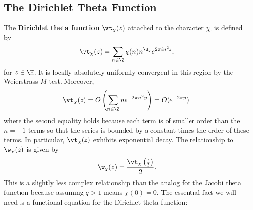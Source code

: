     \subsection*{The Dirichlet Theta Function}
      The \textbf{Dirichlet theta function} \(\vt_{\chi}(z)\) attached to the character \(\chi\), is defined by
      \[
        \vt_{\chi}(z) = \sum_{n \in \Z}\chi(n)n^{\d_{\chi}}e^{2\pi in^{2}z},
      \]
      for \(z \in \H\). It is locally absolutely uniformly convergent in this region by the Weierstrass \(M\)-test. Moreover,
      \[
        \vt_{\chi}(z) = O\left(\sum_{n \in \Z}ne^{-2\pi n^{2}y}\right) = O(e^{-2\pi y}),
      \]
      where the second equality holds because each term is of smaller order than the \(n = \pm 1\) terms so that the series is bounded by a constant times the order of these terms. In particular, \(\vt_{\chi}(z)\) exhibits exponential decay. The relationship to \(\w_{\chi}(z)\) is given by
      \[
        \w_{\chi}(z) = \frac{\vt_{\chi}\left(\frac{z}{2}\right)}{2}.
      \]
      This is a slightly less complex relationship than the analog for the Jacobi theta function because assuming \(q > 1\) means \(\chi(0) = 0\). The essential fact we will need is a functional equation for the Dirichlet theta function:

